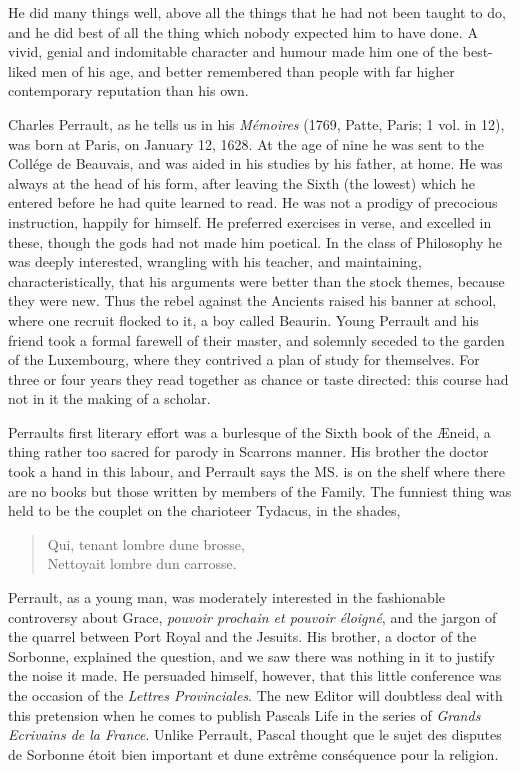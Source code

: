 \documentclass[14pt,a4paper]{memoir}
\begin{document}
He did many things well, above all the things that he had not been
taught to do, and he did best of all the thing which nobody expected him
to have done. A vivid, genial and indomitable character and humour made
him one of the best-liked men of his age, and better remembered than
people with far higher contemporary reputation than his own.

Charles Perrault, as he tells us in his \emph{Mémoires} (1769, Patte,
Paris; 1 vol. in 12), was born at Paris, on January 12, 1628. At the age
of nine he was sent to the Collége de Beauvais, and was aided in his
studies by his father, at home. He was always at the head of his form,
after leaving the Sixth (the lowest) which he entered before he had
quite learned to read. He was not a prodigy of precocious instruction,
happily for himself. He preferred exercises in verse, and excelled in
these, though the gods had not made him poetical. In the class of
Philosophy he was deeply interested, wrangling with his teacher, and
maintaining, characteristically, that his arguments were better than the
stock themes, \textquotesingle because they were new.\textquotesingle{}
Thus the rebel against the Ancients raised his banner at school, where
one recruit flocked to it, a boy called Beaurin. Young Perrault and his
friend took a formal farewell of their master, and solemnly seceded to
the garden of the Luxembourg, where they contrived a plan of study for
themselves. For three or four years they read together as chance or
taste directed: this course had not in it the making of a scholar.

Perrault\textquotesingle s first literary effort was a burlesque of the
Sixth book of the Æneid, a thing rather too sacred for parody in
Scarron\textquotesingle s manner. His brother the doctor took a hand in
this labour, and Perrault says \textquotesingle the MS. is on the shelf
where there are no books but those written by members of the
Family.\textquotesingle{} The funniest thing was held to be the couplet
on the charioteer Tydacus, in the shades,

\begin{verse}
\small
Qui, tenant l\textquotesingle ombre d\textquotesingle une brosse, \\
Nettoyait l\textquotesingle ombre d\textquotesingle un carrosse.
\end{verse}

Perrault, as a young man, was moderately interested in the fashionable
controversy about Grace, \emph{pouvoir prochain et pouvoir éloigné}, and
the jargon of the quarrel between Port Royal and the Jesuits. His
brother, a doctor of the Sorbonne, explained the question,
\textquotesingle and we saw there was nothing in it to justify the noise
it made.\textquotesingle{} He persuaded himself, however, that this
little conference was the occasion of the \emph{Lettres Provinciales}.
The new Editor will doubtless deal with this pretension when he comes to
publish Pascal\textquotesingle s Life in the series of \emph{Grands
Ecrivains de la France}. Unlike Perrault, Pascal thought
\textquotesingle que le sujet des disputes de Sorbonne étoit bien
important et d\textquotesingle une extrême conséquence pour la
religion.\textquotesingle{}
\end{document}
